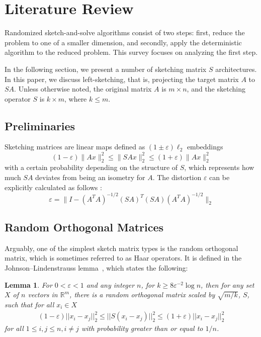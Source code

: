 \documentclass{article}
\newtheorem{lemma}[theorem]{Lemma}
\begin{document}
\section{Literature Review}

Randomized sketch-and-solve algorithms consist of two steps: first, reduce the problem to one of a smaller dimension, and secondly, apply the deterministic algorithm to the reduced problem. This survey focuses on analyzing the first step.

In the following section, we present a number of sketching matrix  $S$ architectures. In this paper, we discuss left-sketching, that is, projecting the target matrix $A$ to $SA$. Unless otherwise noted, the original matrix $A$ is $m \times n$, and the sketching operator $S$ is $k \times m $, where $k \leq m$.

\subsection{Preliminaries}
\label{sec:preliminaries}
Sketching matrices are linear maps defined as $(1\pm \varepsilon) \ell_2$ embeddings 
\begin{equation}
\label{eq:ebedding_property}
    (1 - \varepsilon) \|Ax\|^2_2 \leq \|SAx\|^2_2 \leq (1+\varepsilon) \|Ax\|^2_2
\end{equation}
with a certain probability depending on the structure of $S$, which represents how much $SA$ deviates from being an isometry for $A$. The distortion $\varepsilon$ can be explicitly calculated as follows \cite{magdonismail2019fastfixeddimensionl2subspace}:
\begin{equation}
\label{eq:distortion}
    \varepsilon = \|I - (A^TA)^{-1/2} (SA)^T (SA) (A^TA)^{-1/2}\|_2
\end{equation}

\subsection{Random Orthogonal Matrices}


Arguably, one of the simplest sketch matrix types is the random orthogonal matrix, which is sometimes referred to as Haar operators. It is defined in the Johnson–Lindenstrauss lemma~\cite{https://doi.org/10.1002/rsa.10073,Johnson1984ExtensionsOL}, which states the following:
\begin{lemma}
For $0 < \varepsilon < 1$ and any integer $n$, for $k \geq 8\varepsilon^{-2}\log n $, then for any set $X$ of $n$ vectors in $\mathbb{R}^m$, there is a random orthogonal matrix scaled by $\sqrt{m/k}$, $S$, such that for all $x_i \in X$
\begin{align*}
    (1 - \varepsilon)||x_i - x_j||_2^2 \leq ||S (x_i - x_j)||_2^2 \leq  (1 + \varepsilon)||x_i - x_j||_2^2
\end{align*} 
for all $1 \leq i, j\leq n, i \neq j$ with probability greater than or equal to $1/n$.\end{lemma}
\end{document}
